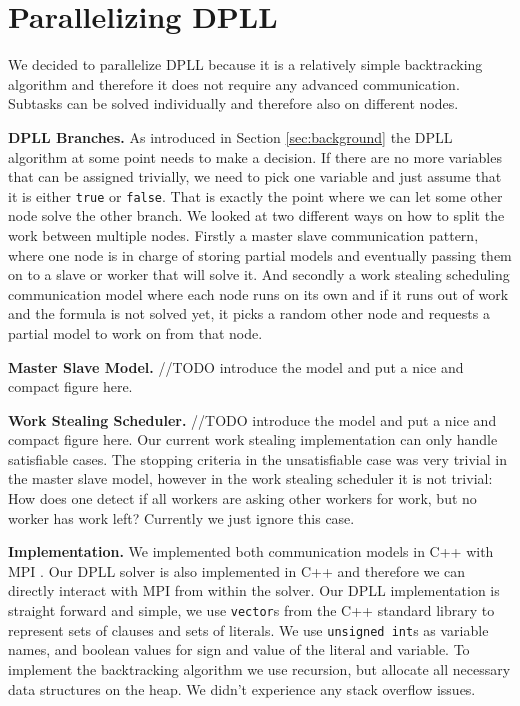 \documentclass[letterpaper]{article}
\newcommand{\mypar}[1]{{\bf #1.}}
\begin{document}
\section{Parallelizing DPLL}\label{sec:parallel_dpll}

We decided to parallelize DPLL because it is a relatively simple backtracking algorithm and therefore it does not require any advanced communication.
Subtasks can be solved individually and therefore also on different nodes.

\mypar{DPLL Branches}
As introduced in Section \ref{sec:background} the DPLL algorithm at some point needs to make a decision.
If there are no more variables that can be assigned trivially, we need to pick one variable and just assume that it is either \texttt{true} or \texttt{false}.
That is exactly the point where we can let some other node solve the other branch.
We looked at two different ways on how to split the work between multiple nodes.
Firstly a master slave communication pattern, where one node is in charge of storing partial models and eventually passing them on to a slave or worker that will solve it.
And secondly a work stealing scheduling communication model where each node runs on its own and if it runs out of work and the formula is not solved yet,
it picks a random other node and requests a partial model to work on from that node.

\mypar{Master Slave Model}
//TODO introduce the model and put a nice and compact figure here.

\mypar{Work Stealing Scheduler}
//TODO introduce the model and put a nice and compact figure here.
Our current work stealing implementation can only handle satisfiable cases.
The stopping criteria in the unsatisfiable case was very trivial in the master slave model, however in the work stealing scheduler it is not trivial:
How does one detect if all workers are asking other workers for work, but no worker has work left?
Currently we just ignore this case.

\mypar{Implementation}
We implemented both communication models in C++ with MPI \cite{mpi}.
Our DPLL solver is also implemented in C++ and therefore we can directly interact with MPI from within the solver.
Our DPLL implementation is straight forward and simple, we use \texttt{vector}s from the C++ standard library to represent sets of clauses and sets of literals.
We use \texttt{unsigned int}s as variable names, and boolean values for sign and value of the literal and variable.
To implement the backtracking algorithm we use recursion, but allocate all necessary data structures on the heap.
We didn't experience any stack overflow issues.
\end{document}

